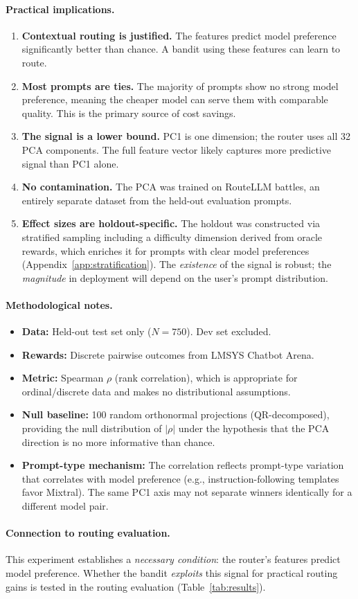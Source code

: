 \paragraph{Practical implications.}
\begin{enumerate}[noitemsep,topsep=2pt]
    \item \textbf{Contextual routing is justified.} The features predict model preference significantly better than chance. A bandit using these features can learn to route.

    \item \textbf{Most prompts are ties.} The majority of prompts show no strong model preference, meaning the cheaper model can serve them with comparable quality. This is the primary source of cost savings.

    \item \textbf{The signal is a lower bound.} PC1 is one dimension; the router uses all 32 PCA components. The full feature vector likely captures more predictive signal than PC1 alone.

    \item \textbf{No contamination.} The PCA was trained on RouteLLM battles, an entirely separate dataset from the held-out evaluation prompts.

    \item \textbf{Effect sizes are holdout-specific.} The holdout was constructed via stratified sampling including a difficulty dimension derived from oracle rewards, which enriches it for prompts with clear model preferences (Appendix~\ref{app:stratification}). The \emph{existence} of the signal is robust; the \emph{magnitude} in deployment will depend on the user's prompt distribution.
\end{enumerate}

\paragraph{Methodological notes.}
\begin{itemize}[noitemsep,topsep=2pt]
    \item \textbf{Data:} Held-out test set only ($N=750$). Dev set excluded.
    \item \textbf{Rewards:} Discrete pairwise outcomes from LMSYS Chatbot Arena.
    \item \textbf{Metric:} Spearman $\rho$ (rank correlation), which is appropriate for ordinal/discrete data and makes no distributional assumptions.
    \item \textbf{Null baseline:} 100 random orthonormal projections (QR-decomposed), providing the null distribution of $|\rho|$ under the hypothesis that the PCA direction is no more informative than chance.
    \item \textbf{Prompt-type mechanism:} The correlation reflects prompt-type variation that correlates with model preference (e.g., instruction-following templates favor Mixtral). The same PC1 axis may not separate winners identically for a different model pair.
\end{itemize}

\paragraph{Connection to routing evaluation.}
This experiment establishes a \emph{necessary condition}: the router's features predict model preference.
Whether the bandit \emph{exploits} this signal for practical routing gains is tested in the routing evaluation (Table~\ref{tab:results}).
